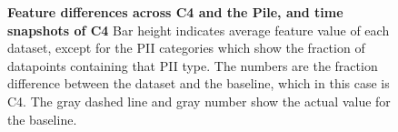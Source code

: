 \documentclass{article}
\begin{document}
\begin{figure}[ht]
\centering
\qquad{}
    \caption{
    \small \textbf{Feature differences across C4 and the Pile, and time snapshots of C4} Bar height indicates average feature value of each dataset, except for the PII categories which show the fraction of datapoints containing that PII type. The numbers are the fraction difference between the dataset and the baseline, which in this case is C4. The gray dashed line and gray number show the actual value for the baseline.}
        \label{fig:c4-pile-composition}
        \vspace{-3mm}
\end{figure}
\end{document}
